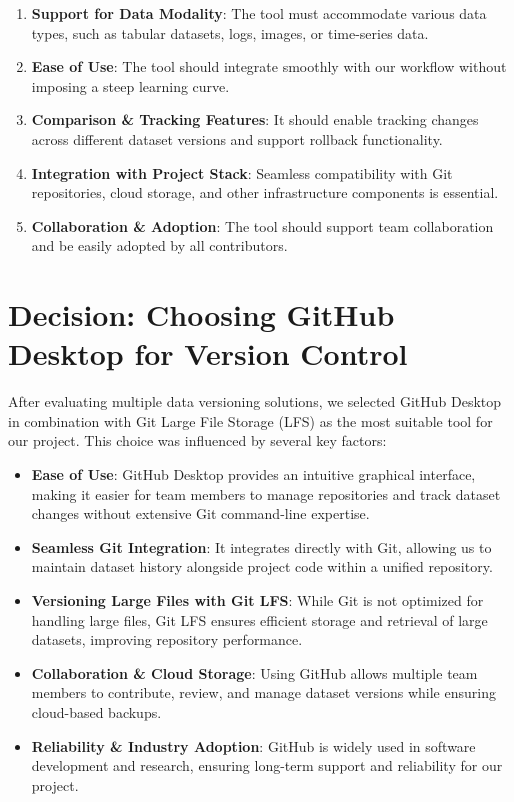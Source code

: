 \begin{enumerate}
    \item \textbf{Support for Data Modality}: The tool must accommodate various data types, such as tabular datasets, logs, images, or time-series data.
    \item \textbf{Ease of Use}: The tool should integrate smoothly with our workflow without imposing a steep learning curve.
    \item \textbf{Comparison \& Tracking Features}: It should enable tracking changes across different dataset versions and support rollback functionality.
    \item \textbf{Integration with Project Stack}: Seamless compatibility with Git repositories, cloud storage, and other infrastructure components is essential.
    \item \textbf{Collaboration \& Adoption}: The tool should support team collaboration and be easily adopted by all contributors.
\end{enumerate}


\section{Decision: Choosing GitHub Desktop for Version Control}
After evaluating multiple data versioning solutions, we selected GitHub Desktop in combination with Git Large File Storage (LFS) as the most suitable tool for our project. This choice was influenced by several key factors:

\begin{itemize}
    \item \textbf{Ease of Use}: GitHub Desktop provides an intuitive graphical interface, making it easier for team members to manage repositories and track dataset changes without extensive Git command-line expertise\cite{GitHubDesktop}.
    \item \textbf{Seamless Git Integration}: It integrates directly with Git, allowing us to maintain dataset history alongside project code within a unified repository\cite{GitHubDesktop}.
    \item \textbf{Versioning Large Files with Git LFS}: While Git is not optimized for handling large files, Git LFS ensures efficient storage and retrieval of large datasets, improving repository performance\cite{GitHubDesktop}.
    \item \textbf{Collaboration \& Cloud Storage}: Using GitHub allows multiple team members to contribute, review, and manage dataset versions while ensuring cloud-based backups\cite{GitHubDesktop}.
    \item \textbf{Reliability \& Industry Adoption}: GitHub is widely used in software development and research, ensuring long-term support and reliability for our project\cite{GitHubDesktop}.
\end{itemize}

